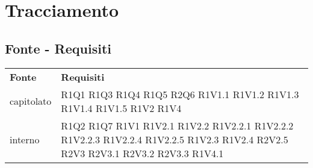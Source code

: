 \section{Tracciamento}
	\subsection{Fonte - Requisiti}
	\begin{longtable} {
		>{\centering}p{28mm}  
		>{}p{20mm}
		}
	\rowcolor{gray!50}
		\textbf{Fonte} & \textbf{Requisiti}	\TBstrut \\
		capitolato & R1Q1 R1Q3 R1Q4 R1Q5 R2Q6 R1V1.1 R1V1.2 R1V1.3 R1V1.4 R1V1.5 R1V2 R1V4 \TBstrut \\ [2mm]
		
		interno & R1Q2 R1Q7 R1V1 R1V2.1 R1V2.2 R1V2.2.1 R1V2.2.2 R1V2.2.3 R1V2.2.4 R1V2.2.5 R1V2.3 R1V2.4 R2V2.5 R2V3 R2V3.1 R2V3.2 R2V3.3 R1V4.1\TBstrut \\ [2mm]
	\end{longtable}

